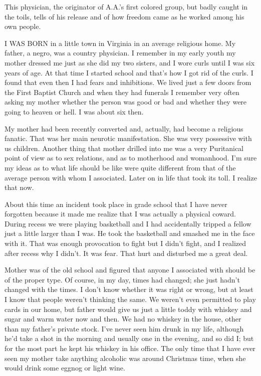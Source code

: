 
\bbChapterPreamble


\begin{biblechapter}
    This physician, 
    the originator of A.A.’s first colored group, 
    but badly caught in the toils, 
    tells of his release 
    and of how freedom came as he worked among his own people.
\end{biblechapter}


\begin{biblechapter}
    I WAS BORN in a little town in Virginia 
        in an average religious home.
\verse My father, a negro, was a country physician.
\verse I remember in my early youth my mother dressed me 
    just as she did my two sisters, 
    and I wore curls until I was six years of age.
\verse At that time I started school 
    and that’s how I got rid of the curls.
\verse I found that even then I had fears and inhibitions.
\verse We lived just a few doors from the First Baptist Church 
    and when they had funerals 
    I remember very often asking my mother 
    whether the person was good or bad 
    and whether they were going to heaven or hell.
\verse I was about six then.

\verse My mother had been recently converted and, actually, had become a religious fanatic. That was her main neurotic manifestation. She was very possessive with us children. Another thing that mother drilled into me was a very Puritanical point of view as to sex relations, and as to motherhood and womanhood. I’m sure my ideas as to what life should be like were quite different from that of the average person with whom I associated. Later on in life that took its toll. I realize that now.

About this time an incident took place in grade school that I have never forgotten because it made me realize that I was actually a physical coward. During recess we were playing basketball and I had accidentally tripped a fellow just a little larger than I was. He took the basketball and smashed me in the face with it. That was enough provocation to fight but I didn’t fight, and I realized after recess why I didn’t. It was fear. That hurt and disturbed me a great deal.

Mother was of the old school and figured that anyone I associated with should be of the proper type. Of course, in my day, times had changed; she just hadn’t changed with the times. I don’t know whether it was right or wrong, but at least I know that people weren’t thinking the same. We weren’t even permitted to play cards in our home, but father would give us just a little toddy with whiskey and sugar and warm water now and then. We had no whiskey in the house, other than my father’s private stock. I’ve never seen him drunk in my life, although he’d take a shot in the morning and usually one in the evening, and so did I; but for the most part he kept his whiskey in his office. The only time that I have ever seen my mother take anything alcoholic was around Christmas time, when she would drink some eggnog or light wine.


\end{biblechapter}
